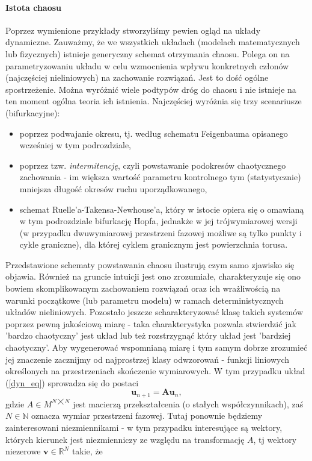 \documentclass[12pt, twoside]{book}
\begin{document}
\paragraph{Istota chaosu} Poprzez wymienione przykłady stworzyliśmy pewien ogląd na układy dynamiczne. Zauważmy, że we wszystkich układach (modelach matematycznych lub fizycznych) istnieje generyczny schemat otrzymania chaosu. Polega on na parametryzowaniu układu w celu wzmocnienia wpływu konkretnych członów (najczęściej nieliniowych) na zachowanie rozwiązań. Jest to dość ogólne spostrzeżenie. Można wyróżnić wiele podtypów dróg do chaosu i nie istnieje na ten moment ogólna teoria ich istnienia. Najczęściej wyróżnia się trzy scenariusze (bifurkacyjne):
\begin{itemize}
	\item poprzez podwajanie okresu, tj. według schematu Feigenbauma opisanego wcześniej w tym podrozdziale,
	\item poprzez tzw. \textit{intermitencję}, czyli powstawanie podokresów chaotycznego zachowania - im większa wartość parametru kontrolnego tym (statystycznie) mniejsza długość okresów ruchu uporządkowanego,
	\item schemat Ruelle'a-Takensa-Newhouse'a, który w istocie opiera się o omawianą w tym podrozdziale bifurkację Hopfa, jednakże w jej trójwymiarowej wersji (w przypadku dwuwymiarowej przestrzeni fazowej możliwe są tylko punkty i cykle graniczne), dla której cyklem granicznym jest powierzchnia torusa.
\end{itemize}
Przedstawione schematy powstawania chaosu ilustrują czym samo zjawisko się objawia. Również na gruncie intuicji jest ono zrozumiałe, charakteryzuje się ono bowiem skomplikowanym zachowaniem rozwiązań oraz ich wrażliwością na warunki początkowe (lub parametru modelu) w ramach deterministycznych układów nieliniowych. \newline 
Pozostało jeszcze scharakteryzować klasę takich systemów poprzez pewną jakościową miarę - taka charakterystyka pozwala stwierdzić jak 'bardzo chaotyczny' jest układ lub też rozstrzygnąć który układ jest 'bardziej chaotyczny'. Aby wygenerować wspomnianą miarę i tym samym dobrze zrozumieć jej znaczenie zacznijmy od najprostrzej klasy odwzorowań - funkcji liniowych określonych na przestrzeniach skończenie wymiarowych. W tym przypadku układ (\ref{dyn_eq}) sprowadza się do postaci
\begin{equation}
	\textbf{u}_{n+1} = \textbf{A}\textbf{u}_{n},
\end{equation}
gdzie $ A \in M^{N \bigtimes N} $ jest macierzą przekształcenia (o stałych współczynnikach), zaś $ N \in \mathbb{N} $ oznacza wymiar przestrzeni fazowej. Tutaj ponownie będziemy zainteresowani niezmiennikami - w tym przypadku interesujące są wektory, których kierunek jest niezmienniczy ze względu na transformację $ A $, tj wektory niezerowe $ \textbf{v} \in \mathbb{R}^{N} $ takie, że
\end{document}
